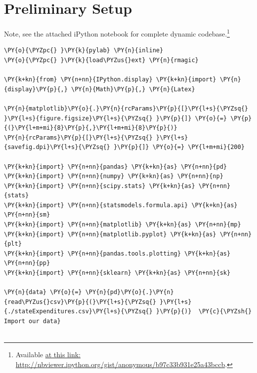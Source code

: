 \documentclass[10pt]{article}\usepackage[]{graphicx}\usepackage[]{xcolor}
\begin{document}
\newpage

\section*{Preliminary Setup}

Note, see the attached iPython notebook for complete dynamic codebase.\footnote{Available
    \href{http://nbviewer.ipython.org/gist/anonymous/b97c33b931e25a43bccb}{at this link: http://nbviewer.ipython.org/gist/anonymous/b97c33b931e25a43bccb}.}

    \begin{Verbatim}[commandchars=\\\{\}]
\PY{o}{\PYZpc{} }\PY{k}{pylab} \PY{n}{inline}
\PY{o}{\PYZpc{} }\PY{k}{load\PYZus{}ext} \PY{n}{rmagic}

\PY{k+kn}{from} \PY{n+nn}{IPython.display} \PY{k+kn}{import} \PY{n}{display}\PY{p}{,} \PY{n}{Math}\PY{p}{,} \PY{n}{Latex}

\PY{n}{matplotlib}\PY{o}{.}\PY{n}{rcParams}\PY{p}{[}\PY{l+s}{\PYZsq{} }\PY{l+s}{figure.figsize}\PY{l+s}{\PYZsq{} }\PY{p}{]} \PY{o}{=} \PY{p}{(}\PY{l+m+mi}{8}\PY{p}{,}\PY{l+m+mi}{8}\PY{p}{)}
\PY{n}{rcParams}\PY{p}{[}\PY{l+s}{\PYZsq{} }\PY{l+s}{savefig.dpi}\PY{l+s}{\PYZsq{} }\PY{p}{]} \PY{o}{=} \PY{l+m+mi}{200}

\PY{k+kn}{import} \PY{n+nn}{pandas} \PY{k+kn}{as} \PY{n+nn}{pd}
\PY{k+kn}{import} \PY{n+nn}{numpy} \PY{k+kn}{as} \PY{n+nn}{np}
\PY{k+kn}{import} \PY{n+nn}{scipy.stats} \PY{k+kn}{as} \PY{n+nn}{stats}
\PY{k+kn}{import} \PY{n+nn}{statsmodels.formula.api} \PY{k+kn}{as} \PY{n+nn}{sm}
\PY{k+kn}{import} \PY{n+nn}{matplotlib} \PY{k+kn}{as} \PY{n+nn}{mp}
\PY{k+kn}{import} \PY{n+nn}{matplotlib.pyplot} \PY{k+kn}{as} \PY{n+nn}{plt}
\PY{k+kn}{import} \PY{n+nn}{pandas.tools.plotting} \PY{k+kn}{as} \PY{n+nn}{pp}
\PY{k+kn}{import} \PY{n+nn}{sklearn} \PY{k+kn}{as} \PY{n+nn}{sk}

\PY{n}{data} \PY{o}{=} \PY{n}{pd}\PY{o}{.}\PY{n}{read\PYZus{}csv}\PY{p}{(}\PY{l+s}{\PYZsq{} }\PY{l+s}{./stateExpenditures.csv}\PY{l+s}{\PYZsq{} }\PY{p}{)}  \PY{c}{\PYZsh{} Import our data}


\end{Verbatim}
\end{document}
